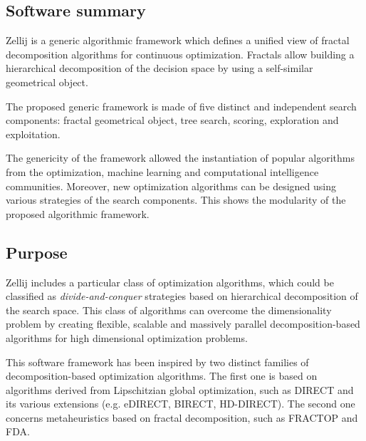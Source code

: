 \subsection{Software summary}
\label{sec:Zellij:summary}

Zellij is a generic algorithmic framework which defines a unified view of fractal decomposition algorithms for continuous optimization. Fractals allow building a hierarchical decomposition of the decision space by using a self-similar geometrical object. 

The proposed generic framework is made of five distinct and independent search components: fractal geometrical object, tree search, scoring, exploration and exploitation. 

The genericity of the framework allowed the instantiation of popular algorithms from the optimization, machine learning and computational intelligence communities. Moreover, new optimization algorithms can be designed using various strategies of the search components. This shows the modularity of the proposed algorithmic framework.


\subsection{Purpose}
\label{sec:Zellij:purpose}

Zellij includes a particular class of optimization algorithms, which could be classified as \textit{divide-and-conquer} strategies based on hierarchical decomposition of the search space. This class of algorithms can overcome the dimensionality problem by creating flexible, scalable and massively parallel decomposition-based algorithms for high dimensional optimization problems.

This software framework has been inspired by two distinct families of decomposition-based optimization algorithms. The first one is based on algorithms derived from Lipschitzian global optimization, such as DIRECT and its various extensions (e.g. eDIRECT, BIRECT, HD-DIRECT). The second one concerns metaheuristics based on fractal decomposition, such as FRACTOP and FDA.

